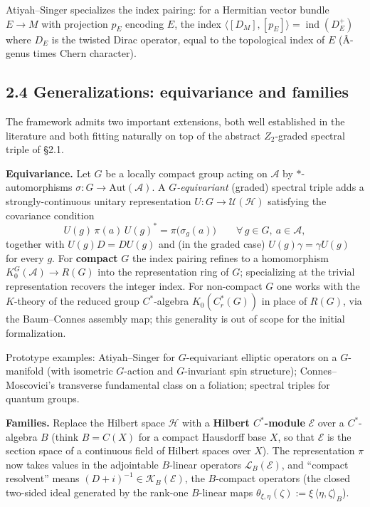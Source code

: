 \documentclass[
  11pt,
]{article}
\begin{document}
Atiyah--Singer specializes the index pairing: for a Hermitian vector
bundle \(E \to M\) with projection \(p_E\) encoding \(E\), the index
\(\langle [D_M], [p_E] \rangle = \mathop{\mathrm{ind}}(D_E^+)\) where
\(D_E\) is the twisted Dirac operator, equal to the topological index of
\(E\) (Â-genus times Chern character).

\subsection{2.4 Generalizations: equivariance and
families}\label{generalizations-equivariance-and-families}

The framework admits two important extensions, both well established in
the literature and both fitting naturally on top of the abstract
\(Z_2\)-graded spectral triple of §2.1.

\textbf{Equivariance.} Let \(G\) be a locally compact group acting on
\(\mathcal{A}\) by \(*\)-automorphisms
\(\sigma\colon G \to \mathrm{Aut}(\mathcal{A})\). A
\emph{\(G\)-equivariant} (graded) spectral triple adds a
strongly-continuous unitary representation
\(U\colon G \to \mathcal{U}(\mathcal{H})\) satisfying the covariance
condition \[
U(g)\,\pi(a)\,U(g)^* = \pi\!\bigl(\sigma_g(a)\bigr)
\qquad \forall\, g \in G,\ a \in \mathcal{A},
\] together with \(U(g)D= DU(g)\) and (in the graded case)
\(U(g)\gamma = \gamma U(g)\) for every \(g\). For \textbf{compact} \(G\)
the index pairing refines to a homomorphism
\(K^G_0(\mathcal{A}) \to R(G)\) into the representation ring of \(G\);
specializing at the trivial representation recovers the integer index.
For non-compact \(G\) one works with the \(K\)-theory of the reduced
group \(C^*\)-algebra \(K_0(C^*_r(G))\) in place of \(R(G)\), via the
Baum--Connes assembly map; this generality is out of scope for the
initial formalization.

Prototype examples: Atiyah--Singer for \(G\)-equivariant elliptic
operators on a \(G\)-manifold (with isometric \(G\)-action and
\(G\)-invariant spin structure); Connes--Moscovici's transverse
fundamental class on a foliation; spectral triples for quantum groups.

\textbf{Families.} Replace the Hilbert space \(\mathcal{H}\) with a
\textbf{Hilbert \(C^*\)-module} \(\mathcal{E}\) over a \(C^*\)-algebra
\(B\) (think \(B = C(X)\) for a compact Hausdorff base \(X\), so that
\(\mathcal{E}\) is the section space of a continuous field of Hilbert
spaces over \(X\)). The representation \(\pi\) now takes values in the
adjointable \(B\)-linear operators \(\mathcal{L}_B(\mathcal{E})\), and
``compact resolvent'' means
\((D+ i)^{-1} \in \mathcal{K}_B(\mathcal{E})\), the \(B\)-compact
operators (the closed two-sided ideal generated by the rank-one
\(B\)-linear maps
\(\theta_{\xi,\eta}(\zeta) := \xi\,\langle \eta, \zeta\rangle_B\)).
\end{document}
